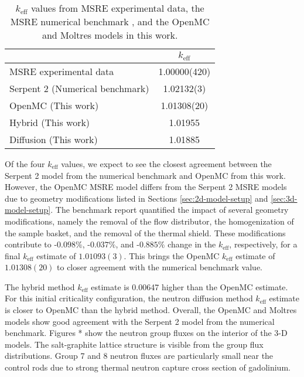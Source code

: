 \begin{table}[htb]
  \centering
  \caption{$k_\text{eff}$ values from \gls{MSRE} experimental data, the \gls{MSRE} numerical
  benchmark \cite{fratoni_molten_2020}, and the OpenMC and Moltres models in this work.}
  \begin{tabular}{l S[table-format=1.5(2)]}
    \toprule
     & {$k_\text{eff}$} \\
     \midrule
    \gls{MSRE} experimental data & 1.00000(420) \\
    Serpent 2 (Numerical benchmark) & 1.02132(3) \\
    OpenMC (This work) & 1.01308(20) \\
    Hybrid (This work) & 1.01955 \\
    Diffusion (This work) & 1.01885 \\
    \bottomrule
  \end{tabular}
  \label{table:initial-crit}
\end{table}

Of the four $k_\text{eff}$ values, we expect to see the closest agreement between the Serpent 2
model from the numerical benchmark and OpenMC from this work. However, the OpenMC \gls{MSRE} model
differs from the Serpent 2 \gls{MSRE} models due to geometry modifications listed in Sections
\ref{sec:2d-model-setup} and \ref{sec:3d-model-setup}. The benchmark report quantified the impact
of several geometry modifications, namely the removal of the flow distributor, the homogenization
of the sample basket, and the removal of the thermal shield. These modifications contribute to
-$0.098\%$, -$0.037\%$, and -$0.885\%$ change in the $k_\text{eff}$, respectively, for a final
$k_\text{eff}$ estimate of $1.01093(3)$. This brings the OpenMC $k_\text{eff}$ estimate of
$1.01308(20)$ to closer agreement with the numerical benchmark value.

The hybrid method $k_\text{eff}$ estimate is 0.00647 higher than the OpenMC estimate. For this
initial criticality configuration, the neutron diffusion method $k_\text{eff}$ estimate is closer
to OpenMC than the hybrid method. Overall, the OpenMC and Moltres models show good agreement with
the Serpent 2 model from the numerical benchmark.
Figures * show the neutron group fluxes on the interior of the 3-D models. The salt-graphite
lattice structure is visible from the group flux distributions. Group 7 and 8 neutron fluxes are
particularly small near the control rods due to strong thermal neutron capture cross section of
gadolinium.

